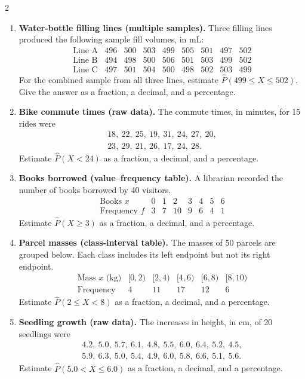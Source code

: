 	\begin{multicols}{2}
	\begin{enumerate}
		\item \textbf{Water-bottle filling lines (multiple samples).}
		Three filling lines produced the following sample fill volumes, in mL:
		\[
		\begin{array}{c|cccccccc}
			\text{Line A}&496&500&503&499&505&501&497&502\\
			\text{Line B}&494&498&500&506&501&503&499&502\\
			\text{Line C}&497&501&504&500&498&502&503&499
		\end{array}
		\]
		For the combined sample from all three lines, estimate
		$\widehat P(499\leq X\leq502)$. Give the answer as a fraction, a
		decimal, and a percentage.

		\item \textbf{Bike commute times (raw data).}
		The commute times, in minutes, for 15 rides were
		\[
		\begin{gathered}
			18,\ 22,\ 25,\ 19,\ 31,\ 24,\ 27,\ 20,\\
			23,\ 29,\ 21,\ 26,\ 17,\ 24,\ 28.
		\end{gathered}
		\]
		Estimate $\widehat P(X<24)$ as a fraction, a decimal, and a percentage.

		\item \textbf{Books borrowed (value--frequency table).}
		A librarian recorded the number of books borrowed by 40 visitors.
		\[
		\begin{array}{c|rrrrrrr}
			\text{Books }x&0&1&2&3&4&5&6\\ \hline
			\text{Frequency }f&3&7&10&9&6&4&1
		\end{array}
		\]
		Estimate $\widehat P(X\geq3)$ as a fraction, a decimal, and a percentage.

		\item \textbf{Parcel masses (class-interval table).}
		The masses of 50 parcels are grouped below. Each class includes its
		left endpoint but not its right endpoint.
		\[
		\begin{array}{c|ccccc}
			\text{Mass }x\text{ (kg)}&[0,2)&[2,4)&[4,6)&[6,8)&[8,10)\\ \hline
			\text{Frequency}&4&11&17&12&6
		\end{array}
		\]
		Estimate $\widehat P(2\leq X<8)$ as a fraction, a decimal, and a percentage.

		\item \textbf{Seedling growth (raw data).}
		The increases in height, in cm, of 20 seedlings were
		\[
		\begin{gathered}
		4.2,\ 5.0,\ 5.7,\ 6.1,\ 4.8,\ 5.5,\ 6.0,\ 6.4,\ 5.2,\ 4.5,\\
		5.9,\ 6.3,\ 5.0,\ 5.4,\ 4.9,\ 6.0,\ 5.8,\ 6.6,\ 5.1,\ 5.6.
		\end{gathered}
		\]
		Estimate $\widehat P(5.0<X\leq6.0)$ as a fraction, a decimal, and a percentage.


\end{enumerate}
\end{multicols}

